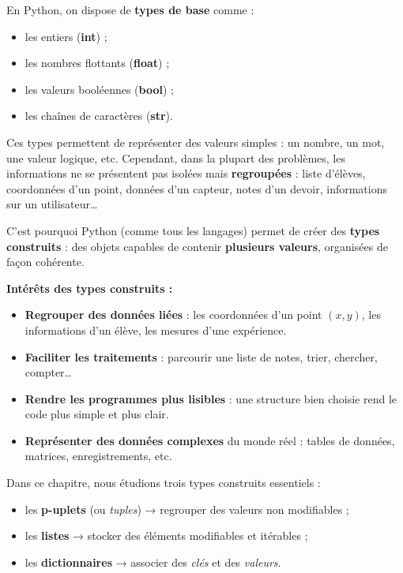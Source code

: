 \documentclass[11pt]{article}
\begin{document}
	\creerDoc
	
	
	En Python, on dispose de \textbf{types de base} comme :
	\begin{itemize}
		\item les entiers (\textbf{int}) ;
		\item les nombres flottants (\textbf{float}) ;
		\item les valeurs booléennes (\textbf{bool}) ;
		\item les chaînes de caractères (\textbf{str}).
	\end{itemize}
	
	Ces types permettent de représenter des valeurs simples : un nombre, un mot, une valeur logique, etc.
	Cependant, dans la plupart des problèmes, les informations ne se présentent pas isolées mais
	\textbf{regroupées} : liste d'élèves, coordonnées d'un point, données d’un capteur, notes d’un devoir,
	informations sur un utilisateur…
	
	\medskip
	
	C’est pourquoi Python (comme tous les langages) permet de créer des \textbf{types construits} : des
	objets capables de contenir \textbf{plusieurs valeurs}, organisées de façon cohérente.
	
	\medskip
	
	\textbf{Intérêts des types construits :}
	\begin{itemize}
		\item \textbf{Regrouper des données liées} : les coordonnées d’un point $(x,y)$, les informations d’un élève, les mesures d’une expérience.
		\item \textbf{Faciliter les traitements} : parcourir une liste de notes, trier, chercher, compter…
		\item \textbf{Rendre les programmes plus lisibles} : une structure bien choisie rend le code plus simple et plus clair.
		\item \textbf{Représenter des données complexes} du monde réel : tables de données, matrices, enregistrements, etc.
	\end{itemize}
	
	\medskip
	
	Dans ce chapitre, nous étudions trois types construits essentiels :
	\begin{itemize}
		\item les \textbf{p-uplets} (ou \textit{tuples}) → regrouper des valeurs non modifiables ;
		\item les \textbf{listes} → stocker des éléments modifiables et itérables ;
		\item les \textbf{dictionnaires} → associer des \textit{clés} et des \textit{valeurs}.
	\end{itemize}
	
\end{document}
